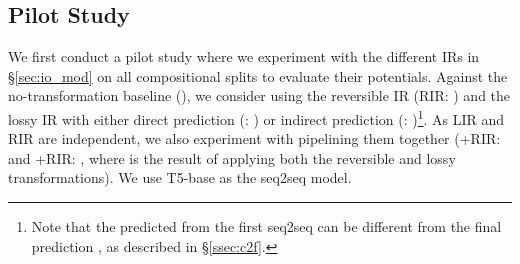 \subsection{Pilot Study}

We first conduct a pilot study where we experiment with the different IRs in \S\ref{sec:io_mod} on all compositional splits to evaluate their potentials.
Against the no-transformation baseline (),
we consider using the
reversible IR (RIR: ) and the
lossy IR with either direct prediction (\LIRdir: ) or indirect prediction (\LIRind: )\footnote{Note that the predicted  from the first seq2seq can be different from the final prediction , as described in \S\ref{ssec:c2f}.}.
As LIR and RIR are independent, we also experiment with pipelining them together (\LIRdir+RIR:  and \LIRind+RIR: , where  is the result of applying both the reversible and lossy transformations).
We use T5-base as the seq2seq model.

\begin{table*}[t]
\centering
{}
\caption{Results on the test set for all approaches and all compositional splits with T5-base.}
\label{tab:results_explore}
\end{table*}

